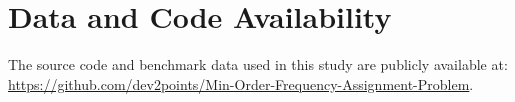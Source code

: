 \documentclass[letterpaper,journal]{IEEEtran}
\begin{document}
\section*{Data and Code Availability}
\label{sec:data_code_availability}
The source code and benchmark data used in this study are publicly available at: \url{https://github.com/dev2points/Min-Order-Frequency-Assignment-Problem}.




\end{document}
